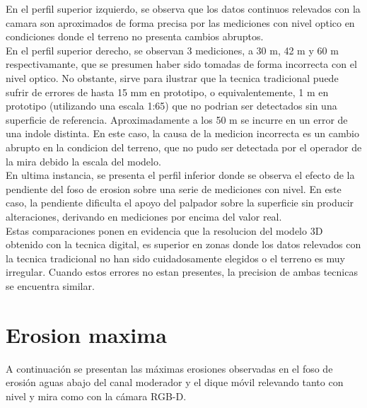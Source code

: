 En el perfil superior izquierdo, se observa que los datos continuos relevados con la camara son aproximados de forma precisa por las mediciones con nivel optico en condiciones donde el terreno no presenta cambios abruptos. \\
En el perfil superior derecho, se observan 3 mediciones, a 30 m, 42 m y 60 m respectivamante, que se presumen haber sido tomadas de forma incorrecta con el nivel optico. No obstante, sirve para ilustrar que la tecnica tradicional puede sufrir de errores de hasta 15 mm en prototipo, o equivalentemente, 1 m en prototipo (utilizando una escala 1:65) que no podrian ser detectados sin una superficie de referencia. Aproximadamente a los 50 m se incurre en un error de una indole distinta. En este caso, la causa de la medicion incorrecta es un cambio abrupto en la condicion del terreno, que no pudo ser detectada por el operador de la mira debido la escala del modelo. \\ 
En ultima instancia, se presenta el perfil inferior donde se observa el efecto de la pendiente del foso de erosion sobre una serie de mediciones con nivel. En este caso, la pendiente dificulta el apoyo del palpador sobre la superficie sin producir alteraciones, derivando en mediciones por encima del valor real. \\
Estas comparaciones ponen en evidencia que la resolucion del modelo 3D obtenido con la tecnica digital, es superior en zonas donde los datos relevados con la tecnica tradicional no han sido cuidadosamente elegidos o el terreno es muy irregular. Cuando estos errores no estan presentes, la precision de ambas tecnicas se encuentra similar.

\section{Erosion maxima}

A continuación se presentan las máximas erosiones observadas en el foso de erosión aguas abajo del canal moderador y el dique móvil relevando tanto con nivel y mira como con la cámara RGB-D.

